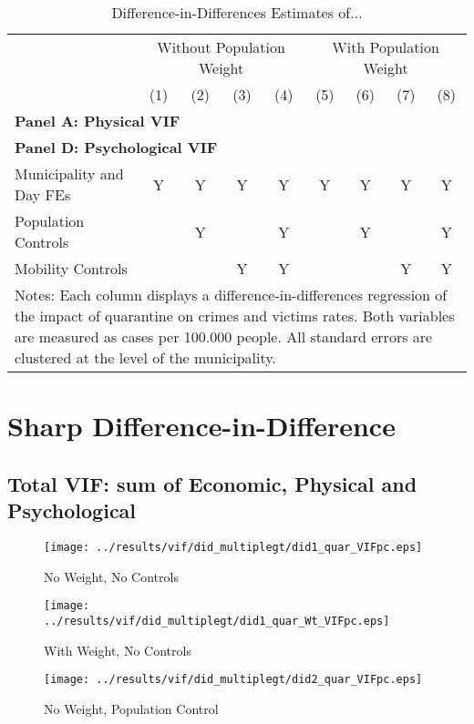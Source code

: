 \documentclass[11pt,letterpaper]{article}
\begin{document}
\begin{landscape}
  \begin{table}
    \centering
    \caption{Difference-in-Differences Estimates of...} \label{tab:DD}
    \begin{tabular}{lcccccccc} \toprule
      &\multicolumn{4}{c}{Without Population Weight}&\multicolumn{4}{c}{With Population Weight} \\ 
      \cmidrule(r){2-5}\cmidrule(r){6-9}
      &(1)&(2)&(3)&(4)&(5)&(6)&(7)&(8) \\ \midrule
      \multicolumn{9}{l}{\textbf{Panel A: Physical VIF}} \\
      
      \midrule
      \multicolumn{9}{l}{\textbf{Panel D: Psychological VIF}} \\
      
      \midrule
      Municipality and Day FEs &Y&Y&Y&Y&Y&Y&Y&Y \\
      Population Controls      & &Y& &Y& &Y& &Y \\
      Mobility Controls        & & &Y&Y& & &Y&Y \\
      \bottomrule
      \multicolumn{9}{p{21.8cm}}{{\footnotesize Notes: Each column displays a difference-in-differences regression of the impact of quarantine on crimes and victims rates. Both variables are measured as cases per 100.000 people.  All standard errors are clustered at the level of the municipality.}}
    \end{tabular}
  \end{table}
\end{landscape}


\section{Sharp Difference-in-Difference}
	\subsection{Total VIF: sum of Economic, Physical and Psychological}
\begin{figure}[H]
\caption{No Weight, No Controls}
\centering
\texttt{[image: ../results/vif/did\_multiplegt/did1\_quar\_VIFpc.eps]}
\end{figure}

\begin{figure}[H]
\caption{With Weight, No Controls}
\centering
\texttt{[image: ../results/vif/did\_multiplegt/did1\_quar\_Wt\_VIFpc.eps]}
\end{figure}
\begin{figure}[H]
\caption{No Weight, Population Control}
\centering
\texttt{[image: ../results/vif/did\_multiplegt/did2\_quar\_VIFpc.eps]}
\end{figure}
\end{document}
